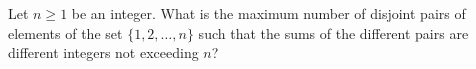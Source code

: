 Let $n \geq 1$ be an integer. What is the maximum number of disjoint pairs of elements of the set $\{ 1,2,\ldots , n \}$ such that the sums of the different pairs are different integers not exceeding $n$?
